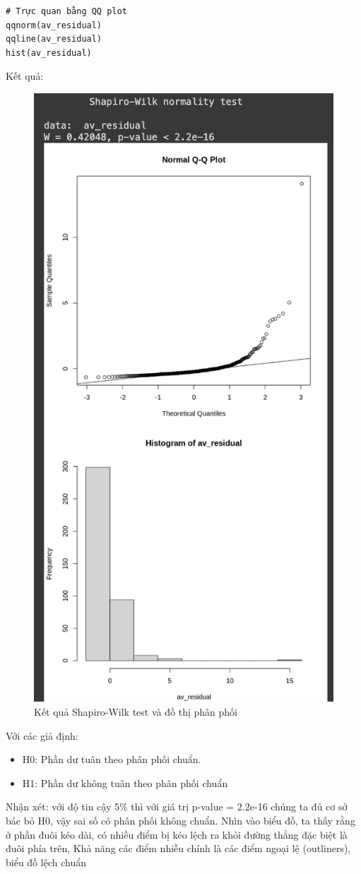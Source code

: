 \begin{itemize}
\begin{itemize}
\begin{lstlisting}
# Trực quan bằng QQ plot
qqnorm(av_residual)
qqline(av_residual)
hist(av_residual)
\end{lstlisting}
Kết quả:
\begin{figure}[H]
    \centering
    \includegraphics[width=0.6\linewidth]{part23_figures/18.png}
    \caption{Kết quả Shapiro-Wilk test và đồ thị phân phối }
    \label{fig:Kết quả Shapiro-Wilk test và đồ thị phân phối }
\end{figure}
Với các giả định:
    \begin{itemize}
        \item H0: Phần dư tuân theo phân phối chuẩn.
        \item H1: Phần dư không tuân theo phân phối chuẩn
    \end{itemize}
Nhận xét: với độ tin cậy 5\% thì với giá trị p-value = 2.2e-16 chúng ta đủ cơ sở bác bỏ H0, vậy sai số có phân phối không chuẩn. Nhìn vào biểu đồ, ta thấy rằng ở phần đuôi kéo dài, có nhiều điểm bị kéo lệch ra khỏi đường thẳng đặc biệt là đuôi phía trên, Khả năng các điểm nhiễu chính là các điểm ngoại lệ (outliners), biểu đồ lệch chuẩn


\end{itemize}
\end{itemize}
